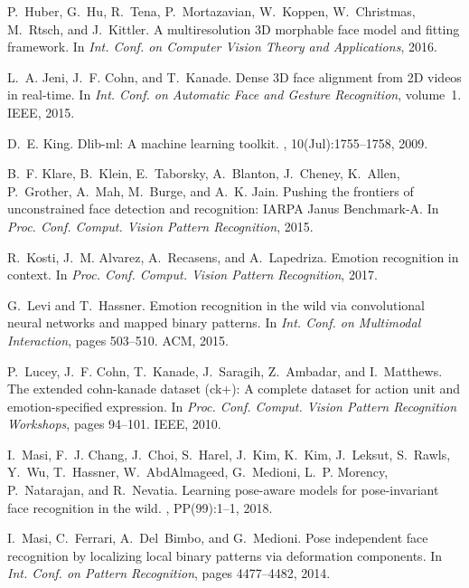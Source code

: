 \documentclass[a4paper, 10pt, conference]{ieeeconf}
\begin{document}
\begin{thebibliography}{10}
P.~Huber, G.~Hu, R.~Tena, P.~Mortazavian, W.~Koppen, W.~Christmas, M.~Rtsch,
  and J.~Kittler.
\newblock A multiresolution {3D} morphable face model and fitting framework.
\newblock In {\em Int. Conf. on Computer Vision Theory and Applications}, 2016.

L.~A. Jeni, J.~F. Cohn, and T.~Kanade.
\newblock Dense {3D} face alignment from {2D} videos in real-time.
\newblock In {\em Int. Conf. on Automatic Face and Gesture Recognition},
  volume~1. IEEE, 2015.

D.~E. King.
\newblock Dlib-ml: A machine learning toolkit.
, 10(Jul):1755--1758, 2009.

B.~F. Klare, B.~Klein, E.~Taborsky, A.~Blanton, J.~Cheney, K.~Allen,
  P.~Grother, A.~Mah, M.~Burge, and A.~K. Jain.
\newblock Pushing the frontiers of unconstrained face detection and
  recognition: {IARPA} {J}anus {B}enchmark-{A}.
\newblock In {\em Proc. Conf. Comput. Vision Pattern Recognition}, 2015.

R.~Kosti, J.~M. Alvarez, A.~Recasens, and A.~Lapedriza.
\newblock Emotion recognition in context.
\newblock In {\em Proc. Conf. Comput. Vision Pattern Recognition}, 2017.

G.~Levi and T.~Hassner.
\newblock Emotion recognition in the wild via convolutional neural networks and
  mapped binary patterns.
\newblock In {\em Int. Conf. on Multimodal Interaction}, pages 503--510. ACM,
  2015.

P.~Lucey, J.~F. Cohn, T.~Kanade, J.~Saragih, Z.~Ambadar, and I.~Matthews.
\newblock The extended cohn-kanade dataset (ck+): A complete dataset for action
  unit and emotion-specified expression.
\newblock In {\em Proc. Conf. Comput. Vision Pattern Recognition Workshops},
  pages 94--101. IEEE, 2010.

I.~Masi, F.~J. Chang, J.~Choi, S.~Harel, J.~Kim, K.~Kim, J.~Leksut, S.~Rawls,
  Y.~Wu, T.~Hassner, W.~AbdAlmageed, G.~Medioni, L.~P. Morency, P.~Natarajan,
  and R.~Nevatia.
\newblock Learning pose-aware models for pose-invariant face recognition in the
  wild.
, PP(99):1--1, 2018.

I.~Masi, C.~Ferrari, A.~Del~Bimbo, and G.~Medioni.
\newblock Pose independent face recognition by localizing local binary patterns
  via deformation components.
\newblock In {\em Int. Conf. on Pattern Recognition}, pages 4477--4482, 2014.


\end{thebibliography}
\end{document}
